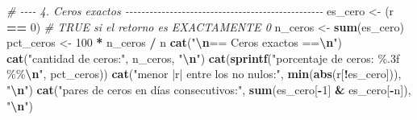 \documentclass[
  spanish,
]{article}
\newenvironment{Shaded}{\begin{snugshade}}{\end{snugshade}}
\newcommand{\CommentTok}[1]{\textcolor[rgb]{0.56,0.35,0.01}{\textit{#1}}}
\newcommand{\DecValTok}[1]{\textcolor[rgb]{0.00,0.00,0.81}{#1}}
\newcommand{\FunctionTok}[1]{\textcolor[rgb]{0.13,0.29,0.53}{\textbf{#1}}}
\newcommand{\NormalTok}[1]{#1}
\newcommand{\OtherTok}[1]{\textcolor[rgb]{0.56,0.35,0.01}{#1}}
\newcommand{\SpecialCharTok}[1]{\textcolor[rgb]{0.81,0.36,0.00}{\textbf{#1}}}
\newcommand{\StringTok}[1]{\textcolor[rgb]{0.31,0.60,0.02}{#1}}
\begin{document}
\begin{Shaded}
\begin{Highlighting}[]
\CommentTok{\# {-}{-}{-}{-} 4. Ceros exactos {-}{-}{-}{-}{-}{-}{-}{-}{-}{-}{-}{-}{-}{-}{-}{-}{-}{-}{-}{-}{-}{-}{-}{-}{-}{-}{-}{-}{-}{-}{-}{-}{-}{-}{-}{-}{-}{-}{-}{-}{-}{-}{-}{-}{-}{-}{-}{-}{-}}
\NormalTok{es\_cero  }\OtherTok{\textless{}{-}}\NormalTok{ (r }\SpecialCharTok{==} \DecValTok{0}\NormalTok{)            }\CommentTok{\# TRUE si el retorno es EXACTAMENTE 0}
\NormalTok{n\_ceros  }\OtherTok{\textless{}{-}} \FunctionTok{sum}\NormalTok{(es\_cero)}
\NormalTok{pct\_ceros }\OtherTok{\textless{}{-}} \DecValTok{100} \SpecialCharTok{*}\NormalTok{ n\_ceros }\SpecialCharTok{/}\NormalTok{ n}
\FunctionTok{cat}\NormalTok{(}\StringTok{"}\SpecialCharTok{\textbackslash{}n}\StringTok{== Ceros exactos ==}\SpecialCharTok{\textbackslash{}n}\StringTok{"}\NormalTok{)}
\FunctionTok{cat}\NormalTok{(}\StringTok{"cantidad de ceros:"}\NormalTok{, n\_ceros, }\StringTok{"}\SpecialCharTok{\textbackslash{}n}\StringTok{"}\NormalTok{)}
\FunctionTok{cat}\NormalTok{(}\FunctionTok{sprintf}\NormalTok{(}\StringTok{"porcentaje de ceros: \%.3f \%\%}\SpecialCharTok{\textbackslash{}n}\StringTok{"}\NormalTok{, pct\_ceros))}
\FunctionTok{cat}\NormalTok{(}\StringTok{"menor |r| entre los no nulos:"}\NormalTok{, }\FunctionTok{min}\NormalTok{(}\FunctionTok{abs}\NormalTok{(r[}\SpecialCharTok{!}\NormalTok{es\_cero])), }\StringTok{"}\SpecialCharTok{\textbackslash{}n}\StringTok{"}\NormalTok{)}
\FunctionTok{cat}\NormalTok{(}\StringTok{"pares de ceros en días consecutivos:"}\NormalTok{,}
    \FunctionTok{sum}\NormalTok{(es\_cero[}\SpecialCharTok{{-}}\DecValTok{1}\NormalTok{] }\SpecialCharTok{\&}\NormalTok{ es\_cero[}\SpecialCharTok{{-}}\NormalTok{n]), }\StringTok{"}\SpecialCharTok{\textbackslash{}n}\StringTok{"}\NormalTok{)}


\end{Highlighting}
\end{Shaded}
\end{document}
